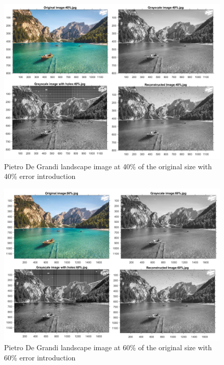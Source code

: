 \begin{figure}[!ht]
\center \includegraphics[scale=0.31]{PietroDeGrandi40.jpg}
\caption{Pietro De Grandi landscape image at 40\% of the original size with 40\% error introduction}
\label{fig:PietroDeGrandi20}
\end{figure}

\begin{figure}[!ht]
\center \includegraphics[scale=0.31]{PietroDeGrandi60.jpg}
\caption{Pietro De Grandi landscape image at 60\% of the original size with 60\% error introduction}
\label{fig:PietroDeGrandi20}
\end{figure}

